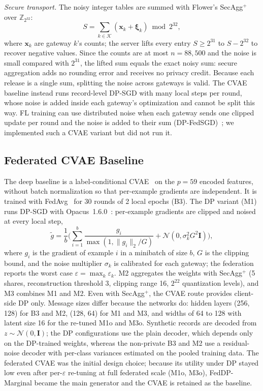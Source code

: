 \documentclass[conference]{IEEEtran}
\begin{document}
\textit{Secure transport.} The noisy integer tables are summed with Flower's SecAgg$^+$~\cite{beutel2020, bell2020} over $\mathbb{Z}_{2^{32}}$:
\begin{equation}
S = \sum_{k \in \mathcal{K}} (\mathbf{x}_k + \boldsymbol{\xi}_k) \bmod 2^{32},
\label{eq:secagg}
\end{equation}
where $\mathbf{x}_k$ are gateway $k$'s counts; the server lifts every entry $S \ge 2^{31}$ to $S - 2^{32}$ to recover negative values. Since the counts are at most $n = 88{,}500$ and the noise is small compared with $2^{31}$, the lifted sum equals the exact noisy sum: secure aggregation adds no rounding error and receives no privacy credit. Because each release is a single sum, splitting the noise across gateways is valid. The CVAE baseline instead runs record-level DP-SGD with many local steps per round, whose noise is added inside each gateway's optimization and cannot be split this way. FL training can use distributed noise when each gateway sends one clipped update per round and the noise is added to their sum (DP-FedSGD)~\cite{kairouz2021, agarwal2021}; we implemented such a CVAE variant but did not run it.

\subsection{Federated CVAE Baseline}\label{subsec:cvae}
The deep baseline is a label-conditional CVAE~\cite{sohn2015cvae} on the $p = 59$ encoded features, without batch normalization so that per-example gradients are independent. It is trained with FedAvg~\cite{mcmahan2017} for 30 rounds of 2 local epochs (B3). The DP variant (M1) runs DP-SGD with Opacus~1.6.0~\cite{abadi2016dpsgd, yousefpour2021}: per-example gradients are clipped and noised at every local step,
\begin{equation}
\tilde{g} = \frac{1}{b} \Big( \sum_{i=1}^{b} \frac{g_i}{\max(1, \|g_i\|_2 / G)} + \mathcal{N}(0, \sigma_k^2 G^2 \mathbf{I}) \Big),
\label{eq:dpsgd}
\end{equation}
where $g_i$ is the gradient of example $i$ in a minibatch of size $b$, $G$ is the clipping bound, and the noise multiplier $\sigma_k$ is calibrated for each gateway; the federation reports the worst case $\varepsilon = \max_k \varepsilon_k$. M2 aggregates the weights with SecAgg$^+$ (5 shares, reconstruction threshold 3, clipping range 16, $2^{22}$ quantization levels), and M3 combines M1 and M2. Even with SecAgg$^+$, the CVAE route provides client-side DP only. Message sizes differ because the networks do: hidden layers (256, 128) for B3 and M2, (128, 64) for M1 and M3, and widths of 64 to 128 with latent size 16 for the re-tuned M1o and M3o. Synthetic records are decoded from $z \sim \mathcal{N}(0, \mathbf{I})$; the DP configurations use the plain decoder, which depends only on the DP-trained weights, whereas the non-private B3 and M2 use a residual-noise decoder with per-class variances estimated on the pooled training data. The federated CVAE was the initial design choice; because its utility under DP stayed low even after per-$\varepsilon$ re-tuning at full federated scale (M1o, M3o), FedDP-Marginal became the main generator and the CVAE is retained as the baseline.
\end{document}
